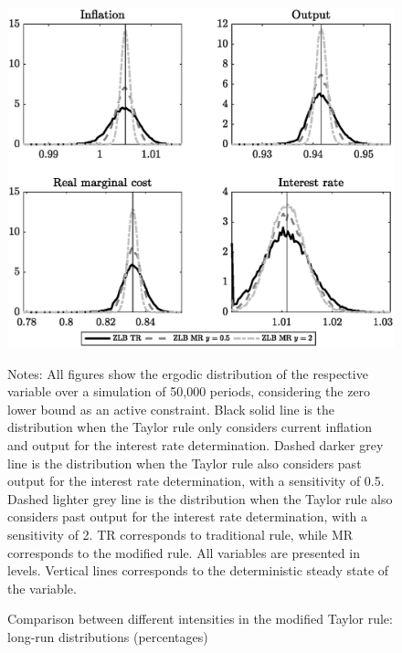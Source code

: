 \documentclass[11pt]{article}
\numberwithin{equation}{section}
\begin{document}
\begin{figure}[H]
	\centering
	\caption{Comparison between different intensities in the modified Taylor rule: long-run distributions (percentages)}\label{fig:distLevel}
	\includegraphics[scale=.6]{distLevel}
	\begin{minipage}{\linewidth}
    	\vspace{1mm}
    	\footnotesize{{\sc Notes:} All figures show the ergodic distribution of the respective variable over a simulation of 50,000 periods, considering the zero lower bound as an active constraint. Black solid line is the distribution when the Taylor rule only considers current inflation and output for the interest rate determination. Dashed darker grey line is the distribution when the Taylor rule also considers past output for the interest rate determination, with a sensitivity of 0.5. Dashed lighter grey line is the distribution when the Taylor rule also considers past output for the interest rate determination, with a sensitivity of 2.  TR corresponds to traditional rule, while MR corresponds to the modified rule. All variables are presented in levels. Vertical lines corresponds to the deterministic steady state of the variable.}
	\end{minipage}
\end{figure}
\end{document}
